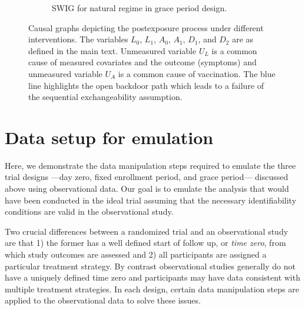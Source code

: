 \begin{appendices}
\begin{refsection}
\begin{figure}[p]
\begin{subfigure}{\linewidth}
        \caption{SWIG for natural regime in grace period design.}
        \end{subfigure}
        \caption{Causal graphs depicting the postexposure process under different interventions. The variables $L_0$, $L_1$, $A_0$, $A_1$, $D_1$, and $D_2$ are as defined in the main text. Unmeasured variable $U_L$ is a common cause of measured covariates and the outcome (symptoms) and unmeasured variable $U_A$ is a common cause of vaccination. The blue line highlights the open backdoor path which leads to a failure of the sequential exchangeability assumption.        \label{fig:swig1}
        }

    \end{figure}

    \clearpage

    
    \section{Data setup for emulation} \label{sec:datamanip}
    Here, we demonstrate the data manipulation steps required to emulate the three trial designs ---day zero, fixed enrollment period, and grace period--- discussed above using observational data. Our goal is to emulate the analysis that would have been conducted in the ideal trial assuming that the necessary identifiability conditions are valid in the observational study.

    Two crucial differences between a randomized trial and an observational study are that 1) the former has a well defined start of follow up, or \textit{time zero}, from which study outcomes are assessed and 2) all participants are assigned a particular treatment strategy. By contrast observational studies generally do not have a uniquely defined time zero and participants may have data consistent with multiple treatment strategies. In each design, certain data manipulation steps are applied to the observational data to solve these issues. 


\end{refsection}
\end{appendices}
